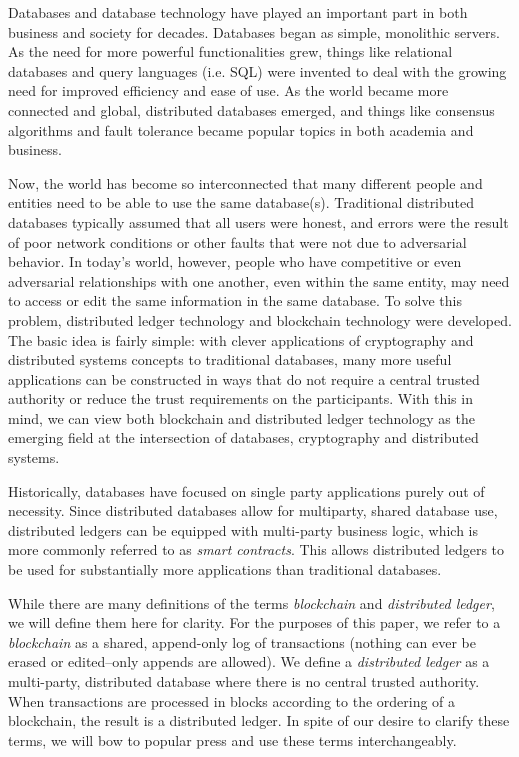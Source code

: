 Databases and database technology have played an important part in both business and society for decades. Databases began as simple, monolithic servers. As the need for more powerful functionalities grew, things like relational databases and query languages (i.e. SQL) were invented to deal with the growing need for improved efficiency and ease of use. As the world became more connected and global, distributed databases emerged, and things like consensus algorithms and fault tolerance became popular topics in both academia and business.

Now, the world has become so interconnected that many different people and entities need to be able to use the same database(s). Traditional distributed databases typically assumed that all users were honest, and errors were the result of poor network conditions or other faults that were not due to adversarial behavior. In today's world, however, people who have competitive or even adversarial relationships with one another, even within the same entity, may need to access or edit the same information in the same database. To solve this problem, distributed ledger technology and blockchain technology were developed. The basic idea is fairly simple: with clever applications of cryptography and distributed systems concepts to traditional databases, many more useful applications can be constructed in ways that do not require a central trusted authority or reduce the trust requirements on the participants. With this in mind, we can view both blockchain and distributed ledger technology as the emerging field at the intersection of databases, cryptography and distributed systems.

Historically, databases have focused on single party applications purely out of necessity.  Since distributed databases allow for multiparty, shared database use, distributed ledgers can be equipped with multi-party business logic, which is more commonly referred to as \emph{smart contracts}.  This allows distributed ledgers to be used for substantially more applications than traditional databases.

While there are many definitions of the terms \emph{blockchain} and \emph{distributed ledger}, we will define them here for clarity. For the purposes of this paper, we refer to a \emph{blockchain} as a shared, append-only log of transactions (nothing can ever be erased or edited--only appends are allowed). We define a \emph{distributed ledger} as a multi-party, distributed database where there is no central trusted authority. When transactions are processed in blocks according to the ordering of a blockchain, the result is a distributed ledger.  In spite of our desire to clarify these terms, we will bow to popular press and use these terms interchangeably. 

